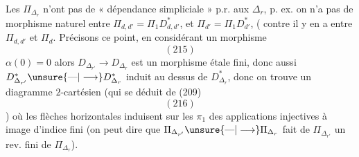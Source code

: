 Les $\Pi_{\Delta_r}$ n'ont pas de « dépendance
simpliciale » p.r. aux $\Delta_r$, p. ex. on n'a
pas de morphisme naturel entre
$\Pi_{d,d'}=\Pi_1D^*_{d,d'}$, et $\Pi_{d'}=\Pi_1D^*_{d'}$, (
contre il y en a entre $\Pi_{d,d'}$ et $\Pi_d$.
Précisons ce point, en considérant un
morphisme
\[
(215)
\]
 $\alpha(0)=0$
alors $D_{\Delta_{r'}}\longrightarrow D_{\Delta_r}$ est un morphisme
étale fini, donc aussi $D^*_{\Delta_{r'}}\unsure{\text{---}|\longrightarrow}D^*_{\Delta_r}$ induit
au dessus de $D^*_{\Delta_r}$, donc on trouve
un diagramme $2$-cartésien (qui 
  se déduit de (209)
\[
(216)
\]
)
où les flèches horizontales induisent sur
les $\pi_1$ des applications injectives à
image d'indice fini (on peut dire que
$\Pi_{\Delta_{r'}}\unsure{\text{---}|\longrightarrow}\Pi_{\Delta_r}$ fait de $\Pi_{\Delta_{r'}}$ un
rev. fini de $\Pi_{\Delta_r}$).

